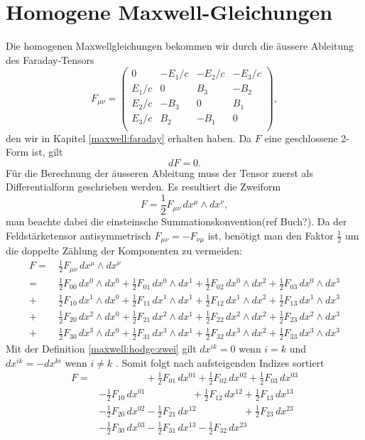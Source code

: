 \section{Homogene Maxwell-Gleichungen}
Die homogenen Maxwellgleichungen bekommen wir durch die äussere Ableitung des Faraday-Tensors 
\[
F_{\mu\nu}
= 
\begin{pmatrix}
	0 & -E_1/c & -E_2/c & -E_3/c \\
	E_1/c &  0 &  B_3 & -B_2 \\
	E_2/c & -B_3 &  0 &  B_1 \\
	E_3/c &  B_2 & -B_1 &  0 \\
\end{pmatrix} ,
\]
den wir in Kapitel \ref{maxwell:faraday} erhalten haben.
Da $F$ eine geschlossene 2-Form ist, gilt
\[
dF = 0 .
\]
Für die Berechnung der äusseren Ableitung muss der Tensor zuerst als Differentialform geschrieben werden.
Es resultiert die Zweiform
\[
F
= \frac{1}{2} F_{\mu\nu} \, dx^\mu \wedge dx^\nu,
\]
man beachte dabei die einsteinsche Summationskonvention(ref Buch?).
Da der Feldstärketensor antisymmetrisch $F_{\mu\nu} = -F_{\nu\mu}$ ist, benötigt man den Faktor $\frac{1}{2}$ um die doppelte Zählung der Komponenten zu vermeiden:
\begin{align*}
	F
	= \,
	&\frac{1}{2} F_{\mu\nu} \, dx^\mu \wedge dx^\nu
	\\
	= \,
	&\frac{1}{2} F_{00} \, dx^0 \wedge dx^0 + \frac{1}{2} F_{01} \, dx^0 \wedge dx^1 + \frac{1}{2} F_{02} \, dx^0 \wedge dx^2 + \frac{1}{2} F_{03} \, dx^0 \wedge dx^3
	\\
	+ \, &\frac{1}{2} F_{10} \, dx^1 \wedge dx^0 + \frac{1}{2} F_{11} \, dx^1 \wedge dx^1 + \frac{1}{2} F_{12} \, dx^1 \wedge dx^2 + \frac{1}{2} F_{13} \, dx^1 \wedge dx^3
	\\
	+ \, &\frac{1}{2} F_{20} \, dx^2 \wedge dx^0 + \frac{1}{2} F_{21} \, dx^2 \wedge dx^1 + \frac{1}{2} F_{22} \, dx^2 \wedge dx^2 + \frac{1}{2} F_{23} \, dx^2 \wedge dx^3
	\\
	+ \, &\frac{1}{2} F_{30} \, dx^3 \wedge dx^0 + \frac{1}{2} F_{31} \, dx^3 \wedge dx^1 + \frac{1}{2} F_{32} \, dx^3 \wedge dx^2 + \frac{1}{2} F_{33} \, dx^3 \wedge dx^3
\end{align*} 
Mit der Definition \ref{maxwell:hodge:zwei} gilt $dx^{ik} = 0$ wenn $i=k$ und $dx^{ik} = -dx^{ki}$ wenn $i \neq k $ . Somit folgt nach aufsteigenden Indizes sortiert
\begin{align*}
	F
	=
	&\phantom{+ \frac{1}{2} F_{00} \, dx^{00}} + \frac{1}{2} F_{01} \, dx^{01} + \frac{1}{2} F_{02} \, dx^{02} + \frac{1}{2} F_{03} \, dx^{03}
	\\
	&- \frac{1}{2} F_{10} \, dx^{01} \phantom{+ \frac{1}{2} F_{11} \, dx^{11}} + \frac{1}{2} F_{12} \, dx^{12} + \frac{1}{2} F_{13} \, dx^{13}
	\\
	&- \frac{1}{2} F_{20} \, dx^{02} - \frac{1}{2} F_{21} \, dx^{12} \phantom{+ \frac{1}{2} F_{22} \, dx^{22}} + \frac{1}{2} F_{23} \, dx^{23}
	\\
	&- \frac{1}{2} F_{30} \, dx^{03} - \frac{1}{2} F_{31} \, dx^{13} - \frac{1}{2} F_{32} \, dx^{23} \phantom{+ \frac{1}{2} F_{33} \, dx^{33}}
\end{align*}
